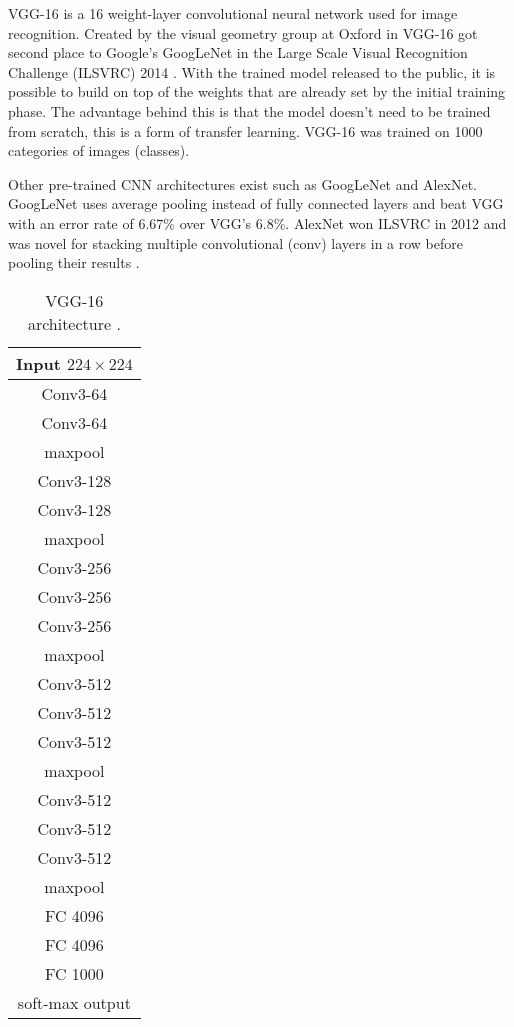 \newcommand{\anet}{AlexNet\xspace}
\newcommand{\gnet}{GoogLeNet\xspace}
\newcommand{\inet}{ImageNet\xspace}

\newcommand{\isize}[1]{$#1 \times #1$}

VGG-16 is a 16 weight-layer convolutional neural network used for image recognition. Created by the visual geometry group at Oxford in \citeyear{vgg16-arxiv} VGG-16 got second place to Google's \gnet in the Large Scale Visual Recognition Challenge (ILSVRC) 2014 \cite{vgg16-arxiv}. With the trained model released to the public, it is possible to build on top of the weights that are already set by the initial training phase. The advantage behind this is that the model doesn't need to be trained from scratch, this is a form of transfer learning. VGG-16 was trained on 1000 categories of images (classes).

Other pre-trained CNN architectures exist such as \gnet and \anet. \gnet uses average pooling instead of fully connected layers \cite{googlenet-paper} and beat VGG with an error rate of 6.67\% over VGG's 6.8\%. \anet won ILSVRC in 2012 and was novel for stacking multiple convolutional (conv) layers in a row before pooling their results \cite{alexnet-paper}. %

\begin{wraptable}{r}{4cm}
    \centering
    \begin{tabular}{| c |}
        \hline
        Input $224 \times 224$ \\
        \hline
        Conv3-64 \\
        Conv3-64 \\
        \hline
        maxpool\\
        \hline
        Conv3-128 \\
        Conv3-128 \\
        \hline
        maxpool \\
        \hline
        Conv3-256 \\
        Conv3-256 \\
        Conv3-256 \\
        \hline
        maxpool \\
        \hline
        Conv3-512 \\
        Conv3-512 \\
        Conv3-512 \\
        \hline
        maxpool \\
        \hline
        Conv3-512 \\
        Conv3-512 \\
        Conv3-512 \\
        \hline
        maxpool\\
        \hline
        FC 4096\\
        \hline
        FC 4096\\
        \hline
        FC 1000\\
        \hline
        soft-max output\\
        \hline
    \end{tabular}
    \caption{VGG-16 architecture \cite{vgg16-arxiv}.}
    \label{vgg-table}
\end{wraptable}

